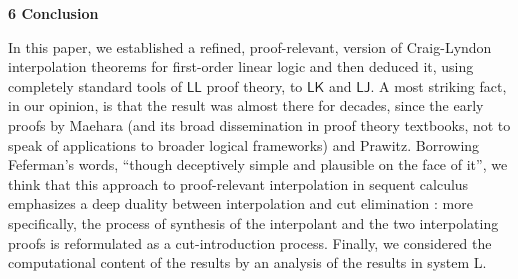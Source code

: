 \documentclass[10pt,a4paper]{article}
\begin{document}
 
 
 


 
\par\medskip\noindent\textbf{6 Conclusion}\par
 
 
In this paper, we established a refined, proof-relevant, version of Craig-Lyndon interpolation theorems for first-order linear logic and then deduced it, using completely standard tools of $\mathsf{LL}$ proof theory, to $\mathsf{LK}$ and $\mathsf{LJ}$. A most striking fact, in our opinion, is that the result was almost there for decades, since the early proofs by Maehara (and its broad dissemination in proof theory textbooks, not to speak of applications to broader logical frameworks) and Prawitz. Borrowing Feferman’s words, “though deceptively simple and plausible on the face of it”, we think that this approach to proof-relevant interpolation in sequent calculus emphasizes a deep duality between interpolation and cut elimination : more specifically, the process of synthesis of the interpolant and the two interpolating proofs is reformulated as a cut-introduction process. Finally, we considered the computational content of the results by an analysis of the results in system L.\par
 
 
 
\end{document}
